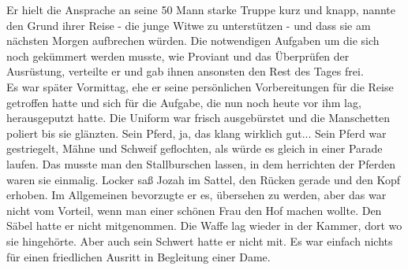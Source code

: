 Er hielt die Ansprache an seine 50 Mann starke Truppe kurz und knapp, nannte den Grund ihrer Reise 
- die junge Witwe zu unterstützen - und dass sie am nächsten Morgen aufbrechen würden. Die 
notwendigen Aufgaben um die sich noch gekümmert werden musste, wie Proviant und das Überprüfen der 
Ausrüstung, verteilte er und gab ihnen ansonsten den Rest des Tages frei.\\
Es war später Vormittag, ehe er seine persönlichen Vorbereitungen für die Reise getroffen hatte und 
sich für die Aufgabe, die nun noch heute vor ihm lag, herausgeputzt hatte. Die Uniform war 
frisch ausgebürstet und die Manschetten poliert bis sie glänzten. Sein Pferd, ja, das klang 
wirklich gut... Sein Pferd war gestriegelt, Mähne und Schweif geflochten, als würde es gleich in 
einer Parade laufen. Das musste man den Stallburschen lassen, in dem herrichten der Pferden waren 
sie einmalig. Locker saß Jozah im Sattel, den Rücken gerade und den Kopf erhoben. Im Allgemeinen 
bevorzugte er es, übersehen zu werden, aber das war nicht vom Vorteil, wenn man einer schönen Frau 
den Hof machen wollte. Den Säbel hatte er nicht mitgenommen. Die Waffe lag wieder in der Kammer, 
dort wo sie hingehörte. Aber auch sein Schwert hatte er nicht mit. Es war einfach nichts für 
einen friedlichen Ausritt in Begleitung einer Dame.\\

 

